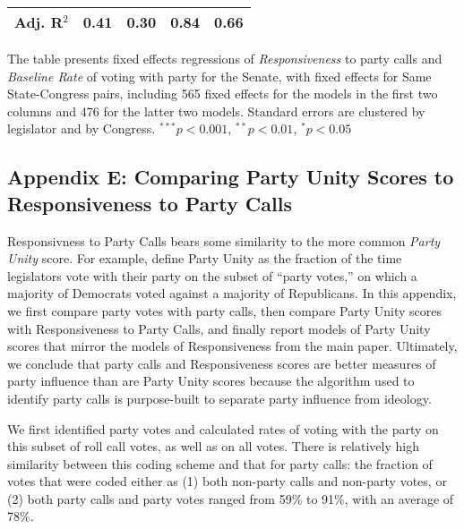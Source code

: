 \documentclass[12pt]{article}
\begin{document}
\begin{table}[!htbp]
\begin{threeparttable}
\begin{tabular}{l c c c c }
Adj. R$^2$                        & 0.41        & 0.30     & 0.84        & 0.66         \\
\hline
\end{tabular}
\begin{tablenotes}
   \item
   The table presents fixed effects regressions of \textit{Responsiveness} to
   party calls and \textit {Baseline Rate} of voting with party for the Senate,
   with fixed effects for Same State-Congress pairs, including 565 fixed
   effects for the models in the first two columns and 476 for the latter two
   models.
   Standard errors are clustered by legislator and by Congress.
   $^{***}p<0.001$, $^{**}p<0.01$, $^*p<0.05$
 \end{tablenotes}
\end{threeparttable}
\end{table}

\clearpage


\subsection*{Appendix E: Comparing Party Unity Scores to Responsiveness to
Party Calls}
%


Responsivness to Party Calls bears some similarity to the more common
\emph{Party Unity} score.
For example, \cite{Carson:2010} define Party Unity as the fraction of the time
legislators vote with their party on the subset of ``party votes,'' on which a
majority of Democrats voted against a majority of Republicans.
In this appendix, we first compare party votes with party calls, then compare
Party Unity scores with Responsiveness to Party Calls, and finally report
models of Party Unity scores that mirror the models of Responsiveness from the
main paper.
Ultimately, we conclude that party calls and Responsiveness scores are
better measures of party influence than are Party Unity scores because the
algorithm used to identify party calls is purpose-built to separate party
influence from ideology.

We first identified party votes and calculated rates of voting with the party
on this subset of roll call votes, as well as on all votes.
There is relatively high similarity between this coding scheme and that for
party calls: the fraction of votes that were coded either as (1) both non-party
calls and non-party votes, or (2) both party calls and party votes ranged from
59\% to 91\%, with an average of 78\%.
\end{document}
